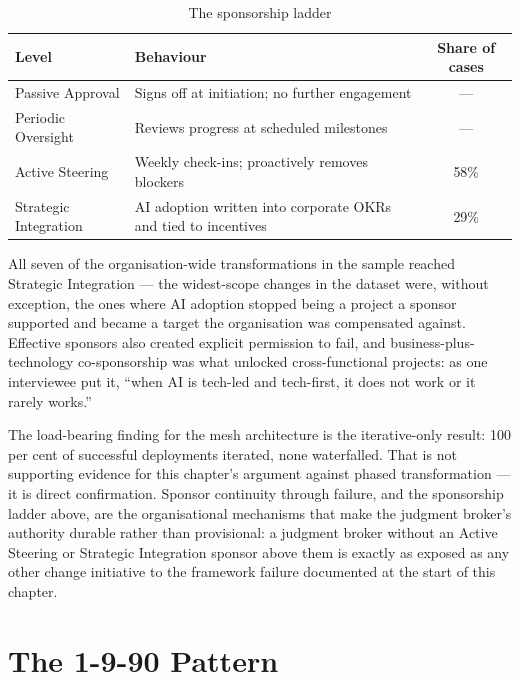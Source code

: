 \begin{table}[h]
\centering
\caption{The sponsorship ladder \parencite{Pereira2026Playbook}}
\label{tab:playbook-sponsorship}
\begin{tabularx}{\textwidth}{l X c}
\toprule
\textbf{Level} & \textbf{Behaviour} & \textbf{Share of cases} \\
\midrule
Passive Approval & Signs off at initiation; no further engagement & --- \\
\addlinespace
Periodic Oversight & Reviews progress at scheduled milestones & --- \\
\addlinespace
Active Steering & Weekly check-ins; proactively removes blockers & 58\% \\
\addlinespace
Strategic Integration & AI adoption written into corporate OKRs and tied to incentives & 29\% \\
\bottomrule
\end{tabularx}
\end{table}

All seven of the organisation-wide transformations in the sample reached Strategic Integration --- the widest-scope changes in the dataset were, without exception, the ones where AI adoption stopped being a project a sponsor supported and became a target the organisation was compensated against. Effective sponsors also created explicit permission to fail, and business-plus-technology co-sponsorship was what unlocked cross-functional projects: as one interviewee put it, ``when AI is tech-led and tech-first, it does not work or it rarely works.''

\begin{keyinsight}
The load-bearing finding for the mesh architecture is the iterative-only result: 100 per cent of successful deployments iterated, none waterfalled. That is not supporting evidence for this chapter's argument against phased transformation --- it is direct confirmation. Sponsor continuity through failure, and the sponsorship ladder above, are the organisational mechanisms that make the judgment broker's authority durable rather than provisional: a judgment broker without an Active Steering or Strategic Integration sponsor above them is exactly as exposed as any other change initiative to the framework failure documented at the start of this chapter.
\end{keyinsight}

\section{The 1-9-90 Pattern}


